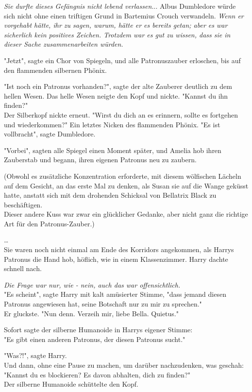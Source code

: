{\emph{Sie durfte dieses Gefängnis nicht lebend verlassen.}.. Albus Dumbledore würde sich nicht ohne einen triftigen Grund in Bartemius Crouch verwandeln. \emph{Wenn er vorgehabt hätte, ihr zu sagen, warum, hätte er es bereits getan; aber es war sicherlich kein positives Zeichen. Trotzdem war es gut zu wissen, dass sie in dieser Sache zusammenarbeiten würden.}

"Jetzt", sagte ein Chor von Spiegeln, und alle Patronuszauber erloschen, bis auf den flammenden silbernen Phönix.

"Ist noch ein Patronus vorhanden?", sagte der alte Zauberer deutlich zu dem hellen Wesen. Das helle Wesen neigte den Kopf und nickte. "Kannst du ihn finden?"\\ Der Silberkopf nickte erneut. "Wirst du dich an es erinnern, sollte es fortgehen und wiederkommen?" Ein letztes Nicken des flammenden Phönix. "Es ist vollbracht", sagte Dumbledore.

"Vorbei", sagten alle Spiegel einen Moment später, und Amelia hob ihren Zauberstab und begann, ihren eigenen Patronus neu zu zaubern.

(Obwohl es zusätzliche Konzentration erforderte, mit diesem wölfischen Lächeln auf dem Gesicht, an das erste Mal zu denken, als Susan sie auf die Wange geküsst hatte, anstatt sich mit dem drohenden Schicksal von Bellatrix Black zu beschäftigen.\\ Dieser andere Kuss war zwar ein glücklicher Gedanke, aber nicht ganz die richtige Art für den Patronus-Zauber.)

…\\ Sie waren noch nicht einmal am Ende des Korridors angekommen, als Harrys Patronus die Hand hob, höflich, wie in einem Klassenzimmer. Harry dachte schnell nach.

\emph{Die Frage war nur, wie - nein, auch das war offensichtlich.}\\ "Es scheint", sagte Harry mit kalt amüsierter Stimme, "dass jemand diesen Patronus angewiesen hat, seine Botschaft nur zu mir zu sprechen."\\ Er gluckste. "Nun denn. Verzeih mir, liebe Bella. Quietus."

Sofort sagte der silberne Humanoide in Harrys eigener Stimme:\\ "Es gibt einen anderen Patronus, der diesen Patronus sucht."

"Was?!", sagte Harry.\\ Und dann, ohne eine Pause zu machen, um darüber nachzudenken, was geschah:\\ "Kannst du es blockieren? Es davon abhalten, dich zu finden?"\\ Der silberne Humanoide schüttelte den Kopf.

}
